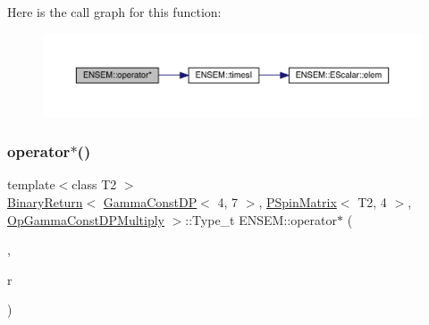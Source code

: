 Here is the call graph for this function\+:\nopagebreak
\begin{figure}[H]
\begin{center}
\leavevmode
\includegraphics[width=350pt]{d6/df5/group__primspinmatrix_ga065100ce0a5fe4278e64d79e1b21c8c7_cgraph}
\end{center}
\end{figure}
\mbox{\label{group__primspinmatrix_ga2c4f08577a26616df666f15bc0a836e8}} 
\subsubsection{\texorpdfstring{operator$\ast$()}{operator*()}\hspace{0.1cm}{\footnotesize\ttfamily [40/64]}}
{\footnotesize\ttfamily template$<$class T2 $>$ \\
\mbox{\hyperlink{structENSEM_1_1BinaryReturn}{Binary\+Return}}$<$ \mbox{\hyperlink{classENSEM_1_1GammaConstDP}{Gamma\+Const\+DP}}$<$ 4, 7 $>$, \mbox{\hyperlink{classENSEM_1_1PSpinMatrix}{P\+Spin\+Matrix}}$<$ T2, 4 $>$, \mbox{\hyperlink{structENSEM_1_1OpGammaConstDPMultiply}{Op\+Gamma\+Const\+D\+P\+Multiply}} $>$\+::Type\+\_\+t E\+N\+S\+E\+M\+::operator$\ast$ (\begin{DoxyParamCaption}\item[{const \mbox{\hyperlink{classENSEM_1_1GammaConstDP}{Gamma\+Const\+DP}}$<$ 4, 7 $>$ \&}]{,  }\item[{const \mbox{\hyperlink{classENSEM_1_1PSpinMatrix}{P\+Spin\+Matrix}}$<$ T2, 4 $>$ \&}]{r }\end{DoxyParamCaption})\hspace{0.3cm}{\ttfamily [inline]}}

\mbox{\label{group__primspinmatrix_ga15c8807596a50758b2f396f050d763c8}} 

